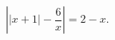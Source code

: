 \begin{ex}[type=equation]
	\begin{condition}
		$\left|\big | x +1\big|-\dfrac{6}{x}\right| = 2- x.$
	\end{condition}
\end{ex}